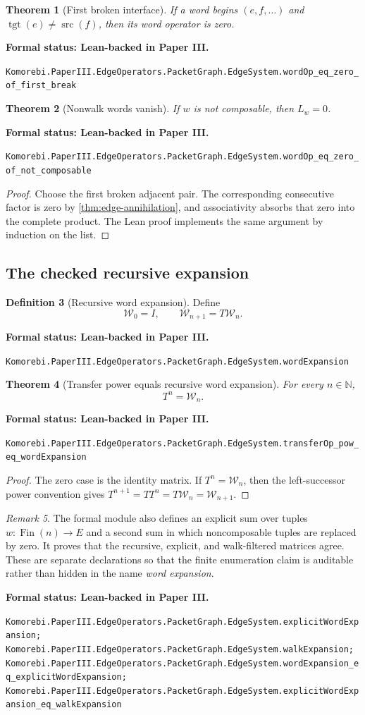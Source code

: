 \documentclass[11pt]{article}
\newtheorem{theorem}{Theorem}[section]
\theoremstyle{definition}
\newtheorem{definition}[theorem]{Definition}
\theoremstyle{remark}
\newtheorem{remark}[theorem]{Remark}
\newcommand{\N}{\mathbb N}
\newcommand{\cW}{\mathcal W}
\newcommand{\src}{\operatorname{src}}
\newcommand{\tgt}{\operatorname{tgt}}
\newcommand{\leanname}[1]{\nolinkurl{#1}}
\newcommand{\statusleanthree}[1]{%
  \par\smallskip\noindent
  {\color{leanblue}\textbf{Formal status: Lean-backed in Paper III.}}\par
  \begingroup\small\raggedright\leanname{#1}\par\endgroup\smallskip}
\begin{document}
\begin{theorem}[First broken interface]
\label{thm:first-break}
If a word begins $(e,f,\ldots)$ and $\tgt(e)\ne\src(f)$, then its word
operator is zero.
\end{theorem}
\statusleanthree{Komorebi.PaperIII.EdgeOperators.PacketGraph.EdgeSystem.wordOp_eq_zero_of_first_break}

\begin{theorem}[Nonwalk words vanish]
\label{thm:nonwalk-vanish}
If $w$ is not composable, then $L_w=0$.
\end{theorem}
\statusleanthree{Komorebi.PaperIII.EdgeOperators.PacketGraph.EdgeSystem.wordOp_eq_zero_of_not_composable}

\begin{proof}
Choose the first broken adjacent pair.  The corresponding consecutive factor
is zero by \cref{thm:edge-annihilation}, and associativity absorbs that zero
into the complete product.  The Lean proof implements the same argument by
induction on the list.
\end{proof}

\subsection{The checked recursive expansion}

\begin{definition}[Recursive word expansion]
\label{def:recursive-word-expansion}
Define
\[
  \cW_0=I,
  \qquad
  \cW_{n+1}=T\cW_n.
\]
\end{definition}
\statusleanthree{Komorebi.PaperIII.EdgeOperators.PacketGraph.EdgeSystem.wordExpansion}

\begin{theorem}[Transfer power equals recursive word expansion]
\label{thm:power-recursive-expansion}
For every $n\in\N$,
\[
  T^n=\cW_n.
\]
\end{theorem}
\statusleanthree{Komorebi.PaperIII.EdgeOperators.PacketGraph.EdgeSystem.transferOp_pow_eq_wordExpansion}

\begin{proof}
The zero case is the identity matrix.  If $T^n=\cW_n$, then the
left-successor power convention gives
$T^{n+1}=TT^n=T\cW_n=\cW_{n+1}$.
\end{proof}

\begin{remark}
The formal module also defines an explicit sum over tuples
$w:\operatorname{Fin}(n)\to E$ and a second sum in which noncomposable tuples
are replaced by zero.  It proves that the recursive, explicit, and
walk-filtered matrices agree.  These are separate declarations so that the
finite enumeration claim is auditable rather than hidden in the name
\emph{word expansion}.
\end{remark}
\statusleanthree{Komorebi.PaperIII.EdgeOperators.PacketGraph.EdgeSystem.explicitWordExpansion; Komorebi.PaperIII.EdgeOperators.PacketGraph.EdgeSystem.walkExpansion; Komorebi.PaperIII.EdgeOperators.PacketGraph.EdgeSystem.wordExpansion_eq_explicitWordExpansion; Komorebi.PaperIII.EdgeOperators.PacketGraph.EdgeSystem.explicitWordExpansion_eq_walkExpansion}
\end{document}
